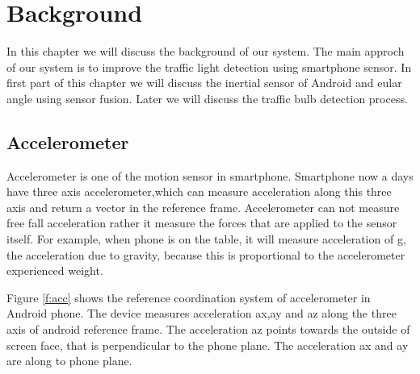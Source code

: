 \chapter{Background}
\label{c:background}
In this chapter we will discuss the background of our system.
The main approch of our system is to improve the traffic light detection using smartphone sensor.
In first part of this chapter we will discuss the inertial sensor of Android and eular angle using sensor fusion.
Later we will discuss the traffic bulb detection process.

\section{Accelerometer}
Accelerometer is one of the motion sensor in smartphone.
Smartphone now a days have three axis accelerometer,which can measure acceleration along this three axis and return a vector in the reference frame.
Accelerometer can not measure free fall acceleration rather it measure the forces that are applied to the sensor itself.
For example, when phone is on the table, it will measure acceleration of g, the acceleration due to gravity, because this is proportional to the accelerometer experienced weight.

Figure \ref{f:acc} shows the reference coordination system of accelerometer in Android phone.
The device measures acceleration ax,ay and az along the three axis of android reference frame.
The acceleration az points towards the outside of screen face, that is perpendicular to the phone plane.
The acceleration ax and ay are along to phone plane.

